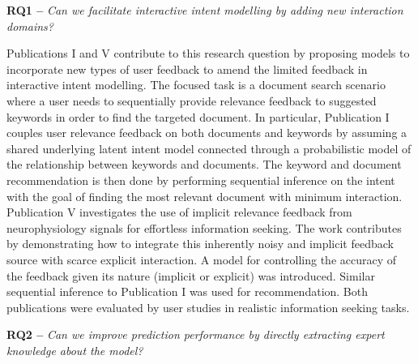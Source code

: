 \documentclass[dissertation,math,vertlayout,pdfa,colorlinks]{aaltoseries}
\begin{document}
\noindent \textbf{RQ1 --} \textit{Can we facilitate interactive intent modelling by adding new interaction domains?}

Publications I and V contribute to this research question by proposing models to incorporate new types of user feedback to amend the limited feedback in interactive intent modelling. The focused task is a document search scenario where a user needs to sequentially provide relevance feedback to suggested keywords in order to find the targeted document. %
In particular, Publication I couples user relevance feedback on both documents and keywords by assuming a shared underlying latent intent model connected through a probabilistic model of the relationship between keywords and documents. The keyword and document recommendation is then done by performing sequential inference on the intent with the goal of finding the most relevant document with minimum interaction.
Publication V investigates the use of implicit relevance feedback from neurophysiology signals for effortless information seeking. The work contributes by demonstrating how to integrate this inherently noisy and implicit feedback source with scarce explicit interaction. A model for controlling the accuracy of the feedback given its nature (implicit or explicit) was introduced. 
Similar sequential inference to Publication I was used for recommendation. 
Both publications were evaluated by user studies in realistic information seeking tasks. 


\noindent \textbf{RQ2 --} \textit{Can we improve prediction performance by directly extracting expert knowledge about the model?}
\end{document}

